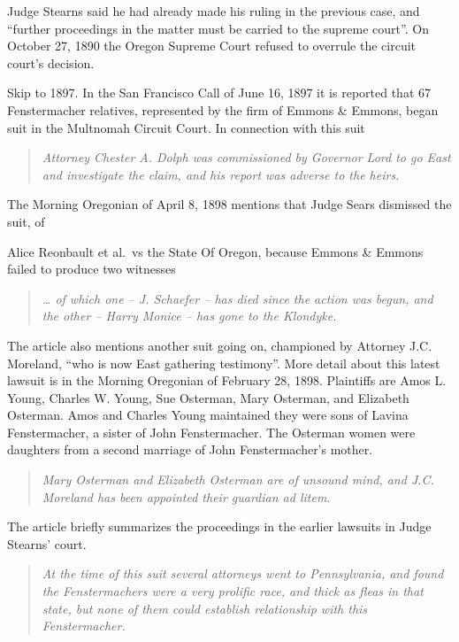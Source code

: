 \documentclass[
  12pt,
]{book}
\begin{document}
Judge Stearns said he had already made his ruling in the previous case, and ``further proceedings in the matter must be carried to the supreme court''. On October 27, 1890 the Oregon Supreme Court refused to overrule the circuit court's decision.

Skip to 1897. In the San Francisco Call of June 16, 1897 it is reported that 67 Fenstermacher relatives, represented by the firm of Emmons \& Emmons, began suit in the Multnomah Circuit Court. In connection with this suit

\begin{quote}
\emph{Attorney Chester A. Dolph was commissioned by Governor Lord to go East and investigate the claim, and his report was adverse to the heirs.}
\end{quote}

The Morning Oregonian of April 8, 1898 mentions that Judge Sears dismissed the suit, of

Alice Reonbault et al.~vs the State Of Oregon, because Emmons \& Emmons failed to produce two witnesses

\begin{quote}
\emph{\ldots{} of which one -- J. Schaefer -- has died since the action was begun, and the other -- Harry Monice -- has gone to the Klondyke.}
\end{quote}

The article also mentions another suit going on, championed by Attorney J.C. Moreland, ``who is now East gathering testimony''. More detail about this latest lawsuit is in the Morning Oregonian of February 28, 1898. Plaintiffs are Amos L. Young, Charles W. Young, Sue Osterman, Mary Osterman, and Elizabeth Osterman. Amos and Charles Young maintained they were sons of Lavina Fenstermacher, a sister of John Fenstermacher. The Osterman women were daughters from a second marriage of John Fenstermacher's mother.

\begin{quote}
\emph{Mary Osterman and Elizabeth Osterman are of unsound mind, and J.C. Moreland has been appointed their guardian ad litem.}
\end{quote}

The article briefly summarizes the proceedings in the earlier lawsuits in Judge Stearns' court.

\begin{quote}
\emph{At the time of this suit several attorneys went to Pennsylvania, and found the Fenstermachers were a very prolific race, and thick as fleas in that state, but none of them could establish relationship with this Fenstermacher.}
\end{quote}
\end{document}
